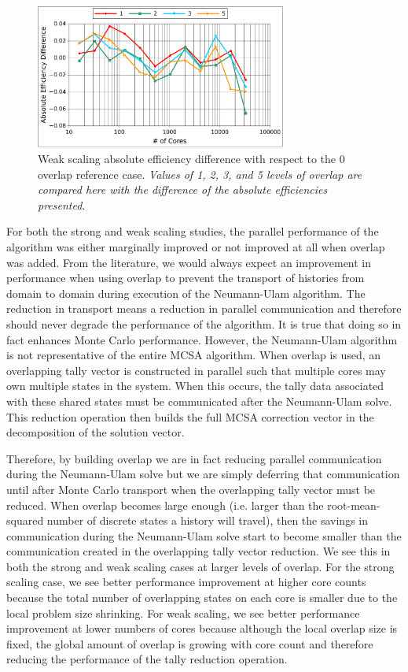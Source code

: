 \documentclass{snamc2013}
\begin{document}
\begin{figure}[H]
  \begin{center}
    \includegraphics[width=3.25in]{titan_weak_overlap_diff.pdf}
  \end{center}
  \caption{Weak scaling absolute efficiency difference with respect to
    the 0 overlap reference case. \textit{Values of 1, 2, 3, and 5
      levels of overlap are compared here with the difference of the
      absolute efficiencies presented.}}
  \label{fig:titan_weak_overlap_diff}
\end{figure}

For both the strong and weak scaling studies, the parallel performance
of the algorithm was either marginally improved or not improved at all
when overlap was added. From the literature, we would always expect an
improvement in performance when using overlap to prevent the transport
of histories from domain to domain during execution of the
Neumann-Ulam algorithm. The reduction in transport means a reduction
in parallel communication and therefore should never degrade the
performance of the algorithm. It is true that doing so in fact
enhances Monte Carlo performance. However, the Neumann-Ulam algorithm
is not representative of the entire MCSA algorithm. When overlap is
used, an overlapping tally vector is constructed in parallel such that
multiple cores may own multiple states in the system. When this
occurs, the tally data associated with these shared states must be
communicated after the Neumann-Ulam solve. This reduction operation
then builds the full MCSA correction vector in the decomposition of
the solution vector.

Therefore, by building overlap we are in fact reducing parallel
communication during the Neumann-Ulam solve but we are simply
deferring that communication until after Monte Carlo transport when
the overlapping tally vector must be reduced. When overlap becomes
large enough (i.e. larger than the root-mean-squared number of
discrete states a history will travel), then the savings in
communication during the Neumann-Ulam solve start to become smaller
than the communication created in the overlapping tally vector
reduction. We see this in both the strong and weak scaling cases at
larger levels of overlap. For the strong scaling case, we see better
performance improvement at higher core counts because the total number
of overlapping states on each core is smaller due to the local problem
size shrinking. For weak scaling, we see better performance
improvement at lower numbers of cores because although the local
overlap size is fixed, the global amount of overlap is growing with
core count and therefore reducing the performance of the tally
reduction operation.
\end{document}
